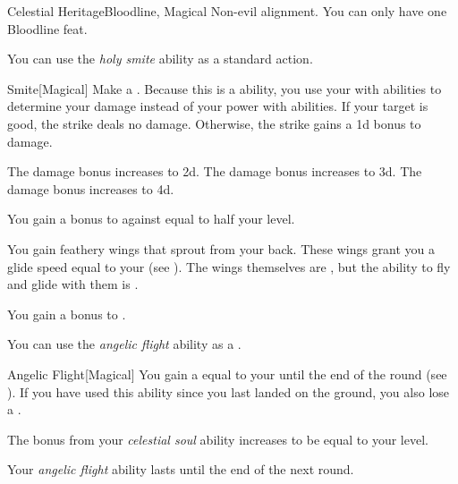    \begin{feat}{Celestial Heritage}{Bloodline, Magical}
        \featpre Non-evil alignment.
         You can only have one Bloodline feat.

         You can use the \textit{holy smite} ability as a standard action.
        \begin{freeability}{Smite}[Magical]
            Make a .
            Because this is a  ability, you use your  with  abilities to determine your damage instead of your power with  abilities.
            If your target is good, the strike deals no damage.
            Otherwise, the strike gains a \plus1d bonus to damage.

            \rankline
             The damage bonus increases to \plus2d.
             The damage bonus increases to \plus3d.
             The damage bonus increases to \plus4d.
        \end{freeability}

         You gain a bonus to  against  equal to half your level.

         You gain feathery wings that sprout from your back.
        These wings grant you a glide speed equal to your  (see ).
        The wings themselves are , but the ability to fly and glide with them is .

         You gain a  bonus to .

         You can use the \textit{angelic flight} ability as a .
        \begin{freeability}{Angelic Flight}[Magical]
            You gain a  equal to your  until the end of the round (see ).
            If you have used this ability since you last landed on the ground, you also lose a .
        \end{freeability}

         The bonus from your \textit{celestial soul} ability increases to be equal to your level.

         Your \textit{angelic flight} ability lasts until the end of the next round.
    \end{feat}

